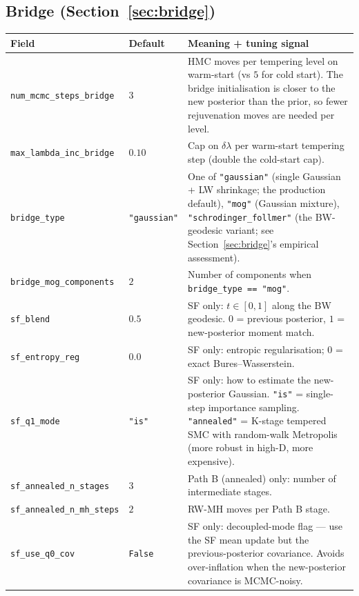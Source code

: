 \subsection{Bridge (Section~\ref{sec:bridge})}

\begin{center}\small
\begin{longtable}{lp{3cm}p{8cm}}
\toprule
Field & Default & Meaning + tuning signal \\
\midrule
\endhead
\texttt{num\_mcmc\_steps\_bridge} & $3$ & HMC moves per tempering level on warm-start (vs $5$ for cold start). The bridge initialisation is closer to the new posterior than the prior, so fewer rejuvenation moves are needed per level. \\
\texttt{max\_lambda\_inc\_bridge}  & $0.10$ & Cap on $\delta\lambda$ per warm-start tempering step (double the cold-start cap). \\
\texttt{bridge\_type}             & \texttt{"gaussian"} & One of \texttt{"gaussian"} (single Gaussian + LW shrinkage; the production default), \texttt{"mog"} (Gaussian mixture), \texttt{"schrodinger\_follmer"} (the BW-geodesic variant; see Section~\ref{sec:bridge}'s empirical assessment). \\
\texttt{bridge\_mog\_components}   & $2$    & Number of components when \texttt{bridge\_type == "mog"}. \\
\texttt{sf\_blend}                 & $0.5$  & SF only: $t \in [0, 1]$ along the BW geodesic. $0$ = previous posterior, $1$ = new-posterior moment match. \\
\texttt{sf\_entropy\_reg}          & $0.0$  & SF only: entropic regularisation; $0$ = exact Bures--Wasserstein. \\
\texttt{sf\_q1\_mode}              & \texttt{"is"} & SF only: how to estimate the new-posterior Gaussian. \texttt{"is"} = single-step importance sampling. \texttt{"annealed"} = K-stage tempered SMC with random-walk Metropolis (more robust in high-D, more expensive). \\
\texttt{sf\_annealed\_n\_stages}   & $3$ & Path B (annealed) only: number of intermediate stages. \\
\texttt{sf\_annealed\_n\_mh\_steps} & $2$ & RW-MH moves per Path B stage. \\
\texttt{sf\_use\_q0\_cov}          & \texttt{False} & SF only: decoupled-mode flag --- use the SF mean update but the previous-posterior covariance. Avoids over-inflation when the new-posterior covariance is MCMC-noisy. \\

\end{longtable}
\end{center}
